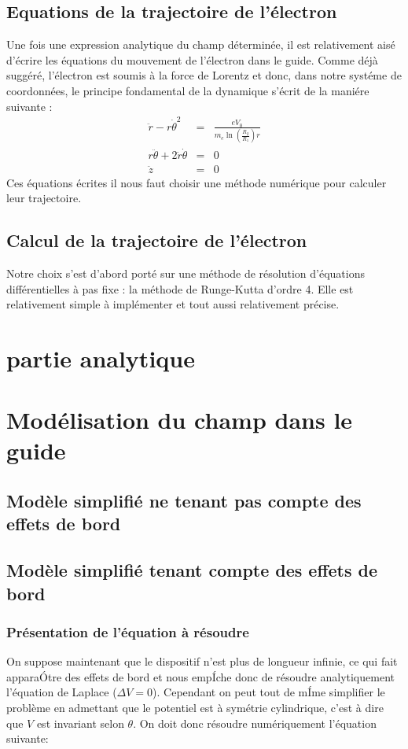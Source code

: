 \documentclass[a4paper,12pt]{article}
\begin{document}
\subsection{Equations de la trajectoire de l'électron}

Une fois une expression analytique du champ déterminée, il est relativement aisé d'écrire les équations du mouvement de l'électron dans le guide. Comme déjà suggéré, l'électron est soumis à la force de Lorentz et donc, dans notre systéme de coordonnées, le principe fondamental de la dynamique s'écrit de la maniére suivante :
\begin{eqnarray}
\ddot{r} - r \dot{\theta}^2 &=& \frac{e V_0}{m_e \ln(\frac{R_2}{R_1}) r} \\
r \ddot{\theta} + 2 \dot{r} \dot{\theta} &=& 0\\
\ddot{z} &=& 0
\end{eqnarray}
Ces équations écrites il nous faut choisir une méthode numérique pour calculer leur trajectoire.

\subsection{Calcul de la trajectoire de l'électron}

Notre choix s'est d'abord porté sur une méthode de résolution d'équations différentielles à pas fixe : la méthode de Runge-Kutta d'ordre 4. Elle est relativement simple à implémenter et tout aussi relativement précise.



\section{partie analytique}


\section{Modélisation du champ dans le guide}
\subsection{Modèle simplifié ne tenant pas compte des effets de bord}

\subsection{Modèle simplifié tenant compte des effets de bord}

\subsubsection{Présentation de l'équation à résoudre}
On suppose maintenant que le dispositif n'est plus de longueur infinie, ce qui fait apparaÓtre des effets de bord et nous empÍche donc de résoudre analytiquement l'équation de Laplace ($\Delta V=0$). Cependant on peut tout de mÍme simplifier le problème en admettant que le potentiel est à symétrie cylindrique, c'est à dire que $V$ est invariant selon $\theta$. On doit donc résoudre numériquement l'équation suivante:
\end{document}

